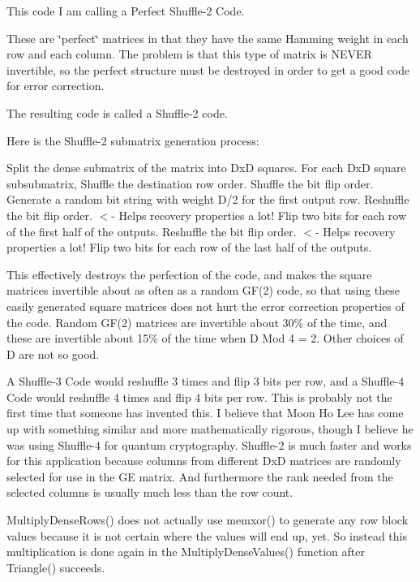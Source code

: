 This code I am calling a Perfect Shuffle-\/2 Code.

These are \char`\"{}perfect\char`\"{} matrices in that they have the same Hamming weight in each row and each column. The problem is that this type of matrix is N\+E\+V\+ER invertible, so the perfect structure must be destroyed in order to get a good code for error correction.

The resulting code is called a Shuffle-\/2 code.

Here is the Shuffle-\/2 submatrix generation process\+:

Split the dense submatrix of the matrix into DxD squares. For each DxD square subsubmatrix, Shuffle the destination row order. Shuffle the bit flip order. Generate a random bit string with weight D/2 for the first output row. Reshuffle the bit flip order. $<$-\/ Helps recovery properties a lot! Flip two bits for each row of the first half of the outputs. Reshuffle the bit flip order. $<$-\/ Helps recovery properties a lot! Flip two bits for each row of the last half of the outputs.

This effectively destroys the perfection of the code, and makes the square matrices invertible about as often as a random G\+F(2) code, so that using these easily generated square matrices does not hurt the error correction properties of the code. Random G\+F(2) matrices are invertible about 30\% of the time, and these are invertible about 15\% of the time when D Mod 4 = 2. Other choices of D are not so good.

A Shuffle-\/3 Code would reshuffle 3 times and flip 3 bits per row, and a Shuffle-\/4 Code would reshuffle 4 times and flip 4 bits per row. This is probably not the first time that someone has invented this. I believe that Moon Ho Lee has come up with something similar and more mathematically rigorous, though I believe he was using Shuffle-\/4 for quantum cryptography. Shuffle-\/2 is much faster and works for this application because columns from different DxD matrices are randomly selected for use in the GE matrix. And furthermore the rank needed from the selected columns is usually much less than the row count.

Multiply\+Dense\+Rows() does not actually use memxor() to generate any row block values because it is not certain where the values will end up, yet. So instead this multiplication is done again in the Multiply\+Dense\+Values() function after Triangle() succeeds. 
